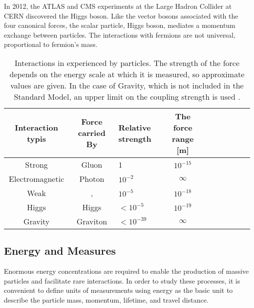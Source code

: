 In 2012, the ATLAS and CMS experiments at the Large Hadron Collider at CERN discovered the Higgs boson. Like the vector bosons associated with the four canonical forces, the scalar particle, Higgs boson, mediates a momentum exchange between particles. The interactions with fermions are not universal, proportional to fermion's mass.

\begin{table}[htp]
\begin{center}
\caption{Interactions in experienced by particles. The strength of the force depends on the energy scale at which it is measured, so approximate values are given. In the case of Gravity, which is not included in the Standard Model, an upper limit on the coupling strength is used \cite{robinson}.}
{\footnotesize
\begin{tabular}{c c l c c c c c c c}
\toprule
Interaction typis      & Force carried By &  Relative strength   & The force range [m]  \\
\midrule
Strong           & Gluon      &  1           & $10^{-15}$ \\
Electromagnetic  & Photon     &  $10^{-2}$   & $\infty$   \\
Weak             & \W, \Z     &  $10^{-5}$   & $10^{-18}$ \\
Higgs            & Higgs      &  $<10^{-5}$  & $10^{-19}$ \\
Gravity          & Graviton   &  $<10^{-39}$ & $\infty$   \\
\bottomrule
\end{tabular}
}
\label{tab:forces}
\end{center}
\end{table}

\subsection{Energy and Measures}

Enormous energy concentrations are required to enable the production of massive particles and facilitate rare interactions.
In order to study these processes, it is convenient to define units of measurements using energy as the basic unit to describe the particle mass, momentum, lifetime, and travel distance.

